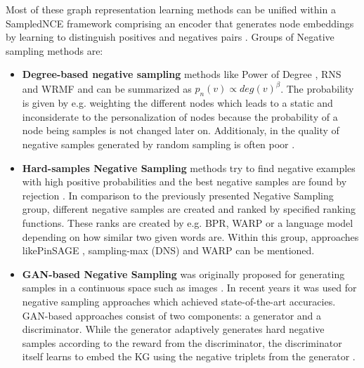 Most of these graph representation learning methods can be unified within a \ac{SampledNCE} framework comprising an encoder that generates node embeddings by learning to distinguish positives and negatives pairs \cite{MCNS}.
Groups of Negative sampling methods are:
\begin{itemize}
    \item 
    \textbf{Degree-based negative sampling} methods like Power of Degree \cite{MikolovSCCD13}, \ac{RNS}\cite{Dupre2018Word2vec} and \ac{WRMF} \cite{Hu2008Collaborative} and can be summarized as $p_n(v) \propto deg(v)^\beta$.
    The probability is given by e.g. weighting the different nodes which leads to a 
    static and inconsiderate to the personalization of nodes \cite{MCNS} because the probability of a node being samples is not changed later on.
    Additionaly, in the quality of negative samples generated by random sampling is  often poor \cite{cai2017kbgan}.
    
    \item 
    \textbf{Hard-samples Negative Sampling} methods try to find negative examples with high positive probabilities and the best negative samples are found by rejection \cite{MCNS}. 
    In comparison to the previously presented Negative Sampling group, 
    different negative samples are created and ranked by specified ranking functions.
    These ranks are created by e.g. \ac{BPR}, \ac{WARP} or a language model depending on how similar two given words are. 
    Within this group, approaches like\ac{PinSAGE} \cite{PinSAGE}, sampling-max (\ac{DNS}) \cite{DNS} and \ac{WARP} \cite{WARP} can be mentioned.
    
    \item 
    \textbf{\ac{GAN}-based Negative Sampling} was originally proposed for
    generating samples in a continuous space such as images \cite{cai2017kbgan}.
    In recent years it was used for negative sampling approaches which achieved state-of-the-art accuracies. 
    \ac{GAN}-based approaches consist of two components:
    a generator and a discriminator. 
    While the generator adaptively generates hard negative samples according to the reward from the discriminator, the discriminator itself learns to embed the \ac{KG} using the negative triplets from the generator \cite{IGAN}.
    
    
\end{itemize}

